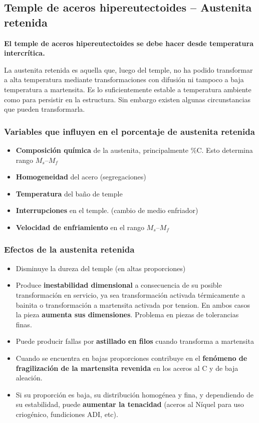\documentclass{article}
\begin{document}
\subsection{Temple de aceros hipereutectoides -- Austenita retenida}
\textbf{El temple de aceros hipereutectoides se debe hacer desde temperatura intercrítica.}

La austenita retenida es aquella que, luego del temple, no ha podido transformar a alta temperatura mediante transformaciones con difusión ni tampoco a baja temperatura a martensita. Es lo suficientemente estable a temperatura ambiente como para persistir en la estructura. Sin embargo existen algunas circunstancias que pueden transformarla.

\subsubsection{Variables que influyen en el porcentaje de austenita retenida}
\begin{itemize}
    \item \textbf{Composición química} de la austenita, principalmente \%C. Esto determina rango $M_s$--$M_f$
    \item \textbf{Homogeneidad} del acero (segregaciones)
    \item \textbf{Temperatura} del baño de temple
    \item \textbf{Interrupciones} en el temple. (cambio de medio enfriador)
    \item \textbf{Velocidad de enfriamiento} en el rango $M_s$--$M_f$
\end{itemize}

\subsubsection{Efectos de la austenita retenida}
\begin{itemize}
    \item Disminuye la dureza del temple (en altas proporciones)
    \item Produce \textbf{inestabilidad dimensional} a consecuencia de su posible transformación en servicio, ya sea transformación activada térmicamente a bainita o transformación a martensita activada por tension. En ambos casos la pieza \textbf{aumenta sus dimensiones}. Problema en piezas de tolerancias finas.
    \item Puede producir fallas por \textbf{astillado en filos} cuando transforma a martensita
    \item Cuando se encuentra en bajas proporciones contribuye en el \textbf{fenómeno de fragilización de la martensita revenida} en los aceros al C y de baja aleación.
    \item Si su proporción es baja, su distribución homogénea y fina, y dependiendo de su estabilidad, puede \textbf{aumentar la tenacidad} (aceros al Níquel para uso criogénico, fundiciones ADI, etc).
\end{itemize}
\end{document}

